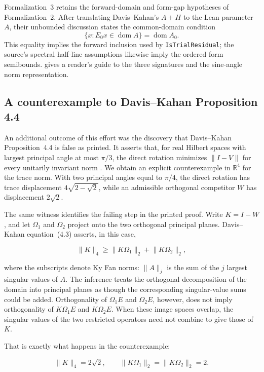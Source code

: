 \documentclass{article}
\begin{document}
Formalization~3 retains the forward-domain and form-gap hypotheses of
Formalization~2.  After translating Davis--Kahan's $A+H$ to the Lean parameter
$A$, their unbounded discussion states the common-domain condition
\[
  \{x:E_0x\in\operatorname{dom}A\}=\operatorname{dom}A_0.
\]
This equality implies the forward inclusion used by \texttt{IsTrialResidual};
the source's spectral half-line assumptions likewise imply the ordered form
semibounds.  
gives a reader's guide to the three signatures and the sine-angle norm
representation.

\subsection{A counterexample to Davis--Kahan Proposition 4.4}
\label{sec:prop44}

An additional outcome of this effort was the discovery that
Davis--Kahan Proposition~4.4 is false as printed. It asserts that, for real
Hilbert spaces with largest principal angle at most $\pi/3$, the direct
rotation minimizes $\lVert I-V\rVert$ for every unitarily invariant norm
\citep{davis1970rotation}. We obtain an explicit counterexample in
$\mathbb{R}^4$ for the trace norm. With two principal angles equal to $\pi/4$,
the direct rotation has trace displacement
$4\sqrt{2-\sqrt{2}}$, while an admissible orthogonal competitor $W$ has
displacement $2\sqrt{2}$.

The same witness identifies the failing step in the printed proof. Write
$K=I-W$, and let $\Omega_1$ and $\Omega_2$ project onto the two orthogonal
principal planes. Davis--Kahan equation~(4.3) asserts, in this case,

$$
  \lVert K\rVert_4
  \geq
  \lVert K\Omega_1\rVert_2+\lVert K\Omega_2\rVert_2,
$$

where the subscripts denote Ky Fan norms: $\lVert A\rVert_j$ is the sum of
the $j$ largest singular values of $A$. The inference treats the orthogonal
decomposition of the domain into principal planes as though the corresponding
singular-value sums could be added. Orthogonality of
$\Omega_1E$ and $\Omega_2E$, however, does not imply orthogonality of
$K\Omega_1E$ and $K\Omega_2E$. When these image spaces overlap, the singular
values of the two restricted operators need not combine to give those of
$K$.

That is exactly what happens in the counterexample:

$$
  \lVert K\rVert_4=2\sqrt{2},
  \qquad
  \lVert K\Omega_1\rVert_2
  =
  \lVert K\Omega_2\rVert_2
  =2.
$$
\end{document}
